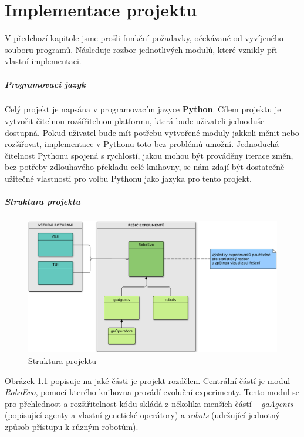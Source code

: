 \chapter{Implementace projektu} \label{chapter-implementace}
V předchozí kapitole jsme prošli funkční požadavky, očekávané od vyvíjeného
souboru programů. Následuje rozbor jednotlivých modulů, které vznikly při
vlastní implementaci. 

\paragraph{Programovací jazyk}
Celý projekt je napsána v programovacím jazyce \textbf{Python}. Cílem projektu
je vytvořit čitelnou rozšířitelnou platformu, která bude uživateli jednoduše
dostupná. Pokud uživatel bude mít potřebu vytvořené moduly jakkoli měnit nebo
rozšiřovat, implementace v Pythonu toto bez problémů umožní. Jednoduchá čitelnost Pythonu
spojená s rychlostí, jakou mohou být prováděny iterace změn, bez potřeby
zdlouhavého překladu celé knihovny, se nám zdají být dostatečně užitečné
vlastnosti pro volbu Pythonu jako jazyka pro tento projekt.

\paragraph{Struktura projektu}

\begin{figure}[!htb]
    \centering
    \includegraphics[width=1\textwidth]{../img/BP_imp_graph.pdf}
    \caption{Struktura projektu}
    \label{fig:struktura}
\end{figure}

Obrázek \ref{fig:struktura} popisuje na jaké části je projekt rozdělen.
Centrální částí je modul \emph{RoboEvo}, pomocí kterého knihovna provádí
evoluční experimenty. Tento modul se pro přehlednost a rozšiřitelnost kódu
skládá z několika menších částí -- \emph{gaAgents} (popisující agenty a vlastní
genetické operátory) a \emph{robots} (udržující jednotný způsob přístupu k
různým robotům). 

